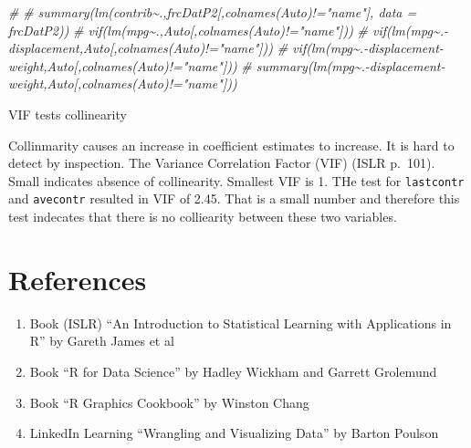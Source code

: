 \documentclass[
]{article}
\newenvironment{Shaded}{\begin{snugshade}}{\end{snugshade}}
\newcommand{\CommentTok}[1]{\textcolor[rgb]{0.56,0.35,0.01}{\textit{#1}}}
\providecommand{\tightlist}{%
  \setlength{\itemsep}{0pt}\setlength{\parskip}{0pt}}
\begin{document}
\begin{Shaded}
\begin{Highlighting}[]
\CommentTok{\# }
\CommentTok{\# summary(lm(contrib\textasciitilde{}.,frcDatP2[,colnames(Auto)!="name"], data = frcDatP2))}
\CommentTok{\# vif(lm(mpg\textasciitilde{}.,Auto[,colnames(Auto)!="name"]))}
\CommentTok{\# vif(lm(mpg\textasciitilde{}.{-}displacement,Auto[,colnames(Auto)!="name"]))}
\CommentTok{\# vif(lm(mpg\textasciitilde{}.{-}displacement{-}weight,Auto[,colnames(Auto)!="name"]))}
\CommentTok{\# summary(lm(mpg\textasciitilde{}.{-}displacement{-}weight,Auto[,colnames(Auto)!="name"]))}
\end{Highlighting}
\end{Shaded}

VIF tests collinearity

Collinmarity causes an increase in coefficient estimates to increase. It
is hard to detect by inspection. The Variance Correlation Factor (VIF)
(ISLR p.~101). Small indicates absence of collinearity. Smallest VIF is
1. THe test for \texttt{lastcontr} and \texttt{avecontr} resulted in VIF
of 2.45. That is a small number and therefore this test indecates that
there is no colliearity between these two variables.

\hypertarget{references}{%
\section{References}\label{references}}

\begin{enumerate}
\def\labelenumi{\arabic{enumi}.}
\tightlist
\item
  Book (ISLR) ``An Introduction to Statistical Learning with
  Applications in R'' by Gareth James et al
\item
  Book ``R for Data Science'' by Hadley Wickham and Garrett Grolemund
\item
  Book ``R Graphics Cookbook'' by Winston Chang
\item
  LinkedIn Learning ``Wrangling and Visualizing Data'' by Barton Poulson
\end{enumerate}
\end{document}
